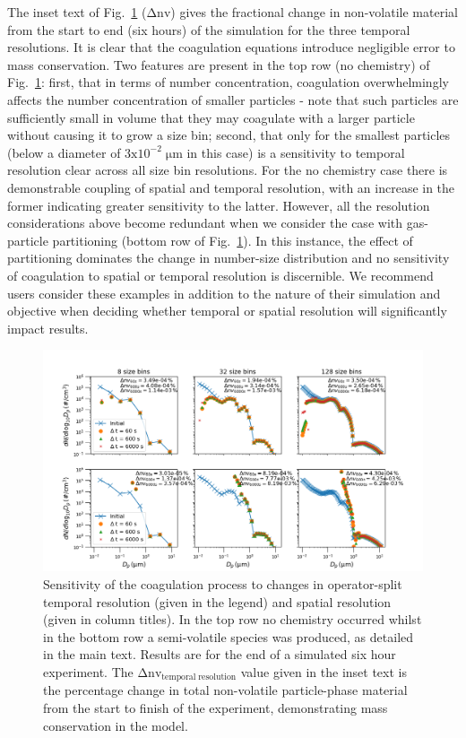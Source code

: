 \documentclass[gmd, manuscript]{copernicus}
\begin{document}
The inset text of Fig.~\ref{fig:coag_resol_test_plot} ($\mathrm{\Delta nv}$) gives the fractional change in non-volatile material from the start to end (six hours) of the simulation for the three temporal resolutions.  It is clear that the coagulation equations introduce negligible error to mass conservation.  Two features are present in the top row (no chemistry) of Fig.~\ref{fig:coag_resol_test_plot}: first, that in terms of number concentration, coagulation overwhelmingly affects the number concentration of smaller particles - note that such particles are sufficiently small in volume that they may coagulate with a larger particle without causing it to grow a size bin; second, that only for the smallest particles (below a diameter of $\mathrm{3x10^{-2}\; \mu m}$ in this case) is a sensitivity to temporal resolution clear across all size bin resolutions.  For the no chemistry case there is demonstrable coupling of spatial and temporal resolution, with an increase in the former indicating greater sensitivity to the latter.  However, all the resolution considerations above become redundant when we consider the case with gas-particle partitioning (bottom row of Fig.~\ref{fig:coag_resol_test_plot}).  In this instance, the effect of partitioning dominates the change in number-size distribution and no sensitivity of coagulation to spatial or temporal resolution is discernible.  We recommend users consider these examples in addition to the nature of their simulation and objective when deciding whether temporal or spatial resolution will significantly impact results.

\begin{figure}[t]
\includegraphics[width=12.0cm]{Results/coag_resol_test_plot.png}
\caption{Sensitivity of the coagulation process to changes in operator-split temporal resolution (given in the legend) and spatial resolution (given in column titles).  In the top row no chemistry occurred whilst in the bottom row a semi-volatile species was produced, as detailed in the main text.  Results are for the end of a simulated six hour experiment.  The $\mathrm{\Delta nv_{temporal\; resolution}}$ value given in the inset text is the percentage change in total non-volatile particle-phase material from the start to finish of the experiment, demonstrating mass conservation in the model.}
\label{fig:coag_resol_test_plot}
\end{figure}
\end{document}
